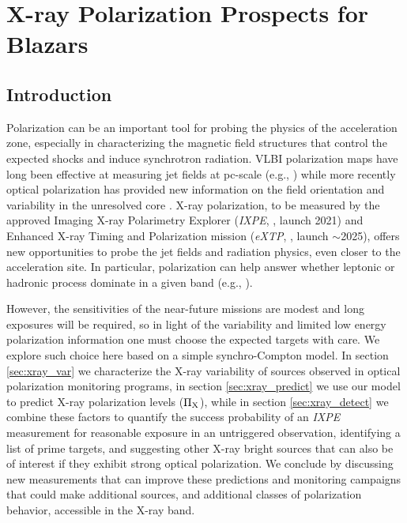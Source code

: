 \chapter{X-ray Polarization Prospects for Blazars}
\label{chap:prospects}

\section{Introduction}

Polarization can be an important tool for probing the physics of the acceleration zone, especially in characterizing the magnetic field structures that control the expected shocks and induce synchrotron radiation. VLBI polarization maps have long been effective at measuring jet fields at pc-scale (e.g., \citealp{hovatta_mojave_2012}) while more recently optical polarization has provided new information on the field orientation and variability in the unresolved core \citep{blinov_robopol_2018}. X-ray polarization, to be measured by the approved  Imaging X-ray Polarimetry Explorer ({\it IXPE}, \citealp{weisskopf_overview_2018}, launch 2021) and Enhanced X-ray Timing and Polarization mission ({\it eXTP}, \citealp{zhang_extp_2017}, launch $\sim$2025), offers new opportunities to probe the jet fields and radiation physics, even closer to the acceleration site. In particular, polarization can help answer whether leptonic or hadronic process dominate in a given band (e.g., \citealp{zhang_polarization_2016}).

However, the sensitivities of the near-future missions are modest and long exposures will
be required, so in light of the variability and limited low energy polarization information one
must choose the expected targets with care. We explore such choice here based on a simple synchro-Compton model. In section \ref{sec:xray_var} we characterize the X-ray variability of sources observed in optical polarization monitoring programs, in section \ref{sec:xray_predict} we use our model to predict X-ray polarization levels ($\rm\Pi_X$), while in section \ref{sec:xray_detect} we combine these factors to quantify the success probability of an {\it IXPE} measurement for reasonable exposure in an untriggered observation, identifying a list of prime targets, and suggesting other X-ray bright sources that can also be of interest if they exhibit strong optical polarization. We conclude by discussing new measurements that can improve these predictions and monitoring campaigns that could make additional sources, and additional classes of polarization behavior, accessible in the X-ray band.


